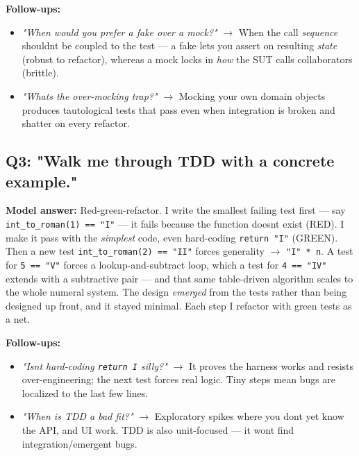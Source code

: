 \documentclass[11pt]{article}
\providecommand{\tightlist}{\setlength{\itemsep}{1pt}\setlength{\parskip}{0pt}}
\begin{document}
\textbf{Follow-ups:}

\begin{itemize}
\tightlist
\item
  \emph{"When would you prefer a fake over a mock?"} \(\rightarrow\) When the call \emph{sequence} shouldn\textquotesingle t be coupled to the test --- a fake lets you assert on resulting \emph{state} (robust to refactor), whereas a mock locks in \emph{how} the SUT calls collaborators (brittle).
\item
  \emph{"What\textquotesingle s the over-mocking trap?"} \(\rightarrow\) Mocking your own domain objects produces tautological tests that pass even when integration is broken and shatter on every refactor.
\end{itemize}

\subsection{Q3: "Walk me through TDD with a concrete example."}\label{q3-walk-me-through-tdd-with-a-concrete-example}

\textbf{Model answer:} Red-green-refactor. I write the smallest failing test first --- say \texttt{int\_to\_roman(1)\ ==\ "I"} --- it fails because the function doesn\textquotesingle t exist (RED). I make it pass with the \emph{simplest} code, even hard-coding \texttt{return\ "I"} (GREEN). Then a new test \texttt{int\_to\_roman(2)\ ==\ "II"} forces generality \(\rightarrow\) \texttt{"I"\ *\ n}. A test for \texttt{5\ ==\ "V"} forces a lookup-and-subtract loop, which a test for \texttt{4\ ==\ "IV"} extends with a subtractive pair --- and that same table-driven algorithm scales to the whole numeral system. The design \emph{emerged} from the tests rather than being designed up front, and it stayed minimal. Each step I refactor with green tests as a net.

\textbf{Follow-ups:}

\begin{itemize}
\tightlist
\item
  \emph{"Isn\textquotesingle t hard-coding \texttt{return\ \textquotesingle{}I\textquotesingle{}} silly?"} \(\rightarrow\) It proves the harness works and resists over-engineering; the next test forces real logic. Tiny steps mean bugs are localized to the last few lines.
\item
  \emph{"When is TDD a bad fit?"} \(\rightarrow\) Exploratory spikes where you don\textquotesingle t yet know the API, and UI work. TDD is also unit-focused --- it won\textquotesingle t find integration/emergent bugs.
\end{itemize}
\end{document}
